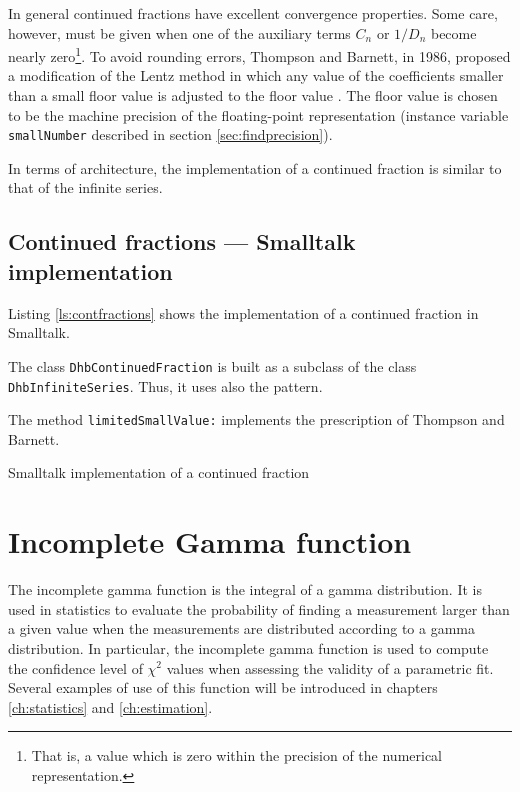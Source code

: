 \documentclass[twoside]{book}
\begin{document}
In general continued fractions have excellent convergence
properties. Some care, however, must be given when one of the
auxiliary terms $C_n$ or $1/D_n$ become nearly zero\footnote{That
is, a value which is zero within the precision of the numerical
representation.}. To avoid rounding errors, Thompson and Barnett,
in 1986, proposed a modification of the Lentz method in which any
value of the coefficients smaller than a small floor value is
adjusted to the floor value \cite{Press}. The floor value is
chosen to be the machine precision of the floating-point
representation (instance variable {\tt smallNumber} described in
section \ref{sec:findprecision}).

In terms of architecture, the implementation of a continued
fraction is similar to that of the infinite series.

\subsection{Continued fractions --- Smalltalk  implementation}
 Listing \ref{ls:contfractions} shows
the implementation of a continued fraction in Smalltalk.

The class {\tt DhbContinuedFraction} is built as a subclass of the
class {\tt DhbInfiniteSeries}. Thus, it uses also the
 pattern.

The method {\tt limitedSmallValue:} implements the prescription of
Thompson and Barnett.
\begin{listing} Smalltalk implementation of a continued fraction \label{ls:contfractions}

\end{listing}

\section{Incomplete Gamma function}
\label{sec:incGamma} The incomplete gamma function is the integral
of a gamma distribution. It is used in statistics to evaluate the
probability of finding a measurement larger than a given value
when the measurements are distributed according to a gamma
distribution. In particular, the incomplete gamma function is used
to compute the confidence level of $\chi^2$ values when assessing
the validity of a parametric fit. Several examples of use of this
function will be introduced in chapters \ref{ch:statistics} and
\ref{ch:estimation}.
\end{document}
